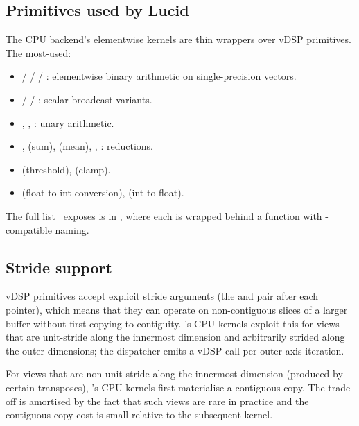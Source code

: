 \subsection{Primitives used by Lucid}
\label{ssec:accelerate:vdsp_used}

The CPU backend's elementwise kernels are thin wrappers over vDSP
primitives. The most-used:

\begin{itemize}
  \item {} /  /  /
    : elementwise binary arithmetic on
    single-precision vectors.
  \item {} /  / :
    scalar-broadcast variants.
  \item {}, , :
    unary arithmetic.
  \item {},  (sum), 
    (mean), , : reductions.
  \item {} (threshold),  (clamp).
  \item {} (float-to-int conversion),
     (int-to-float).
\end{itemize}

The full list \Lucid\ exposes is in
, where each is
wrapped behind a function with -compatible
naming.

\subsection{Stride support}
\label{ssec:accelerate:vdsp_strides}

vDSP primitives accept explicit stride arguments (the  and
 pair after each pointer), which means that they can
operate on non-contiguous slices of a larger buffer without first
copying to contiguity. \Lucid's CPU kernels exploit this for views
that are unit-stride along the innermost dimension and arbitrarily
strided along the outer dimensions; the dispatcher emits a vDSP
call per outer-axis iteration.

For views that are non-unit-stride along the innermost dimension
(produced by certain transposes), \Lucid's CPU kernels first
materialise a contiguous copy. The trade-off is amortised by the
fact that such views are rare in practice and the contiguous copy
cost is small relative to the subsequent kernel.

